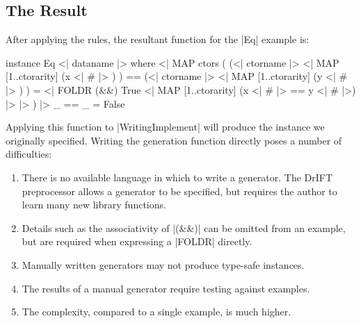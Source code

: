 \documentclass{llncs}
\begin{document}
\subsection{The Result}

After applying the rules, the resultant function for the |Eq| example is:

\begin{code}
instance Eq \? <| dataname |> where
    <| MAP ctors (
        (<| ctorname |> \? <| MAP [1..ctorarity] (x <| # |> ) ) ==
        (<| ctorname |> \? <| MAP [1..ctorarity] (y <| # |> ) ) =
        <| FOLDR (&&) True \? <| MAP [1..ctorarity] (x <| # |> == y <| # |>) |> |>
    ) |>
    _ == _ = False
\end{code}

Applying this function to |WritingImplement| will produce the instance we originally specified. Writing the generation function directly poses a number of difficulties:

\begin{enumerate}
\item There is no available language in which to write a generator. The DrIFT preprocessor \cite{drift} allows a generator to be specified, but requires the author to learn many new library functions.
\item Details such as the associativity of |(&&)| can be omitted from an example, but are required when expressing a |FOLDR| directly.
\item Manually written generators may not produce type-safe instances.
\item The results of a manual generator require testing against examples.
\item The complexity, compared to a single example, is much higher.
\end{enumerate}
\end{document}
